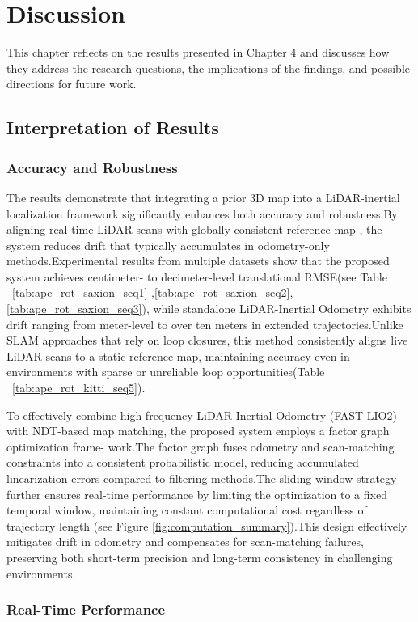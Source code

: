 \chapter{Discussion}
\label{ch:discu}
This chapter reflects on the results presented in Chapter 4 and discusses how they address
the research questions, the implications of the findings, and possible directions for future
work.
\section{Interpretation of Results}
\subsection{Accuracy and Robustness  }
The results demonstrate that integrating a prior 3D map into a LiDAR-inertial localization framework significantly enhances both accuracy and robustness.By aligning real-time LiDAR scans with globally consistent reference  map , the system reduces drift that typically accumulates in odometry-only methods.Experimental results from multiple datasets show that the proposed system achieves centimeter- to decimeter-level translational RMSE(see  Table ~\ref{tab:ape_rot_saxion_seq1} ,\ref{tab:ape_rot_saxion_seq2}, \ref{tab:ape_rot_saxion_seq3}), while standalone LiDAR-Inertial Odometry exhibits drift ranging from meter-level to over ten meters in extended trajectories.Unlike SLAM approaches that rely on loop closures, this method consistently aligns live LiDAR scans to a static reference map, maintaining accuracy even in environments with sparse or unreliable loop opportunities(Table ~\ref{tab:ape_rot_kitti_seq5}).

To effectively combine high-frequency LiDAR-Inertial Odometry (FAST-LIO2) with
NDT-based map matching, the proposed system employs a factor graph optimization frame-
work.The factor graph fuses odometry and scan-matching constraints into a consistent probabilistic model, reducing accumulated linearization errors compared to filtering methods.The sliding-window strategy further ensures real-time performance by limiting the optimization to a fixed temporal window, maintaining constant computational cost regardless of trajectory length (see Figure \ref{fig:computation_summary}).This
design effectively mitigates drift in odometry and compensates for scan-matching failures,
preserving both short-term precision and long-term consistency in challenging environments.

\subsection{Real-Time Performance }

